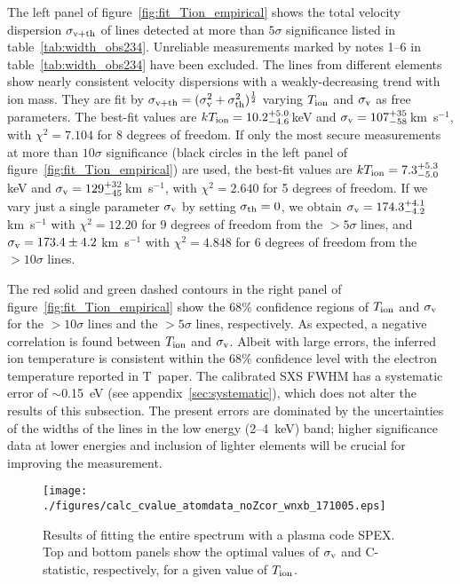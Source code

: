 The left panel of figure~\ref{fig:fit_Tion_empirical} shows the total velocity dispersion $\sigma_{\rm v+th}$ of lines detected at more than $5\sigma$ significance listed in table~\ref{tab:width_obs234}. Unreliable measurements marked by notes 1--6 in table~\ref{tab:width_obs234} have been excluded. The lines from different elements show nearly consistent velocity dispersions with a weakly-decreasing trend with ion mass. They are fit by $\sigma_{\rm v+th}=(\sigma_{\rm v}^2 + \sigma_{\rm th}^2)^\frac{1}{2}$ varying $T_{\rm ion}$ and $\sigma_{\rm v}$ as free parameters. The best-fit values are $kT_{\rm ion} = 10.2^{+5.0}_{-4.6}$\,keV and $\sigma_{\rm v}=107^{+35}_{-58}$\,km~s$^{-1}$, with $\chi^2=7.104$ for 8 degrees of freedom. If only the most secure measurements at more than $10 \sigma$ significance (black circles in the left panel of figure~\ref{fig:fit_Tion_empirical}) are used, the best-fit values are $kT_{\rm ion} = 7.3^{+5.3}_{-5.0}$\,keV and $\sigma_{\rm v}=129^{+32}_{-45}$\,km~s$^{-1}$, with $\chi^2=2.640$ for 5 degrees of freedom. If we vary just a single parameter $\sigma_{\rm v}$ by setting $\sigma_{\rm th}=0$, we obtain $\sigma_{\rm v}=174.3^{+4.1}_{-4.2}$ km~s$^{-1}$ with $\chi^2=12.20$ for 9 degrees of freedom from the $> 5 \sigma$ lines, and $\sigma_{\rm v}=173.4\pm4.2$ km~s$^{-1}$ with $\chi^2=4.848$ for 6 degrees of freedom from the $> 10 \sigma$ lines.

The red solid and green dashed contours in the right panel of figure~\ref{fig:fit_Tion_empirical} show the 68\% confidence regions of $T_{\rm ion}$ and $\sigma_{\rm v}$ for the $> 10 \sigma$ lines and the $> 5 \sigma$ lines, respectively. As expected, a negative correlation is found between $T_{\rm ion}$ and $\sigma_{\rm v}$. Albeit with large errors, the inferred ion temperature is consistent within the 68\% confidence level with the electron temperature reported in T~paper. The calibrated SXS FWHM has a systematic error of $\sim$0.15~eV (see appendix~\ref{sec:systematic}), which does not alter the results of this subsection. The present errors are dominated by the uncertainties of the widths of the lines in the low energy (2--4~keV) band; higher significance data at lower energies and inclusion of lighter elements will be crucial for improving the measurement.

\begin{figure}[h]
\begin{center}
 \texttt{[image: ./figures/calc\_cvalue\_atomdata\_noZcor\_wnxb\_171005.eps]}
\end{center}
\caption{Results of fitting the entire spectrum with a plasma code SPEX. Top and bottom panels show the optimal values of $\sigma_{\rm v}$ and C-statistic, respectively, for a given value of $T_{\rm ion}$.}
\label{fig:fit_Tion_spex}
\end{figure}

